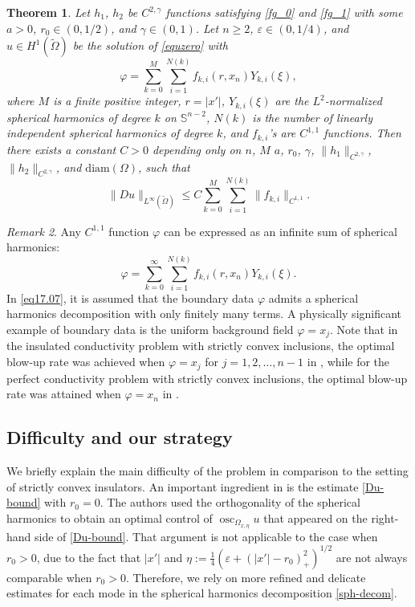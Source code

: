 \documentclass[reqno, 10pt]{amsart}
\theoremstyle{plain}
\newtheorem{theorem}{Theorem}[section]
\theoremstyle{definition}
\theoremstyle{remark}
\newtheorem{remark}[theorem]{Remark}
\newcommand{\osc}{\operatorname{osc}}
\numberwithin{equation}{section}
\begin{document}
\begin{theorem}\label{main-thm}
Let $h_1$, $h_2$ be $C^{2,\gamma}$ functions satisfying \eqref{fg_0} and \eqref{fg_1} with some $a > 0$, $r_0 \in (0, 1/2)$, and $\gamma\in(0,1)$. Let $n \ge 2$, $\varepsilon \in(0,1/4)$, and $u \in H^1(\widetilde\Omega)$ be the solution of \eqref{equzero} with 
\begin{equation}
    \label{eq17.07}
\varphi= \sum_{k=0}^M\sum_{i=1}^{N(k)} {f}_{k,i}(r,x_n)Y_{k,i}(\xi),
\end{equation}
where $M$ is a finite positive integer, $r = |x'|$, $Y_{k,i}(\xi)$ are the $L^2$-normalized spherical harmonics of degree $k$ on $\mathbb{S}^{n-2}$, $N(k)$ is the number of linearly independent spherical harmonics of degree $k$, and ${f}_{k,i}$'s are $C^{1,1}$ functions. Then there exists a constant $C>0$ depending only on $n$, $M$ $a$, $r_0$, $\gamma$, $\|h_1\|_{C^{2,\gamma}}$, $\|h_2\|_{C^{2,\gamma}}$, and $\text{diam}(\Omega)$, such that
\begin{equation}\label{main-eq}
\|D u\|_{L^\infty(\widetilde\Omega)} \le  C \sum_{k=0}^M\sum_{i=1}^{N(k)} \|{f}_{k,i}\|_{C^{1,1}}.
\end{equation}
\end{theorem}

\begin{remark}
Any $C^{1,1}$ function $\varphi$ can be expressed as an infinite sum of spherical harmonics:
$$
\varphi= \sum_{k=0}^\infty \sum_{i=1}^{N(k)} {f}_{k,i}(r,x_n)Y_{k,i}(\xi).
$$
In \eqref{eq17.07}, it is assumed that the boundary data $\varphi$ admits a spherical harmonics decomposition with only finitely many terms.
A physically significant example of boundary data is the uniform background field $\varphi = x_j$. Note that in the insulated conductivity problem with strictly convex inclusions, the optimal blow-up rate was achieved when $\varphi = x_j$ for $j = 1, 2, \ldots, n-1$ in \cites{DLY}, while for the perfect conductivity problem with strictly convex inclusions, the optimal blow-up rate was attained when $\varphi = x_n$ in \cites{BLY1}.
\end{remark}


\subsection{Difficulty and our strategy}\label{sec1.1}

We briefly explain the main difficulty of the problem in comparison to the setting of strictly convex insulators. An important ingredient in \cite{DLY} is the estimate \eqref{Du-bound} with $r_0=0$. The authors used the orthogonality of the spherical harmonics to obtain an optimal control of $\osc_{\Omega_{x,\eta}}u$ that appeared on the right-hand side of \eqref{Du-bound}. That argument is not applicable to the case when $r_0>0$, due to the fact that $|x'|$ and $\eta:= \frac{1}{4} (\varepsilon + (|x'|-r_0)_+^2)^{1/2}$ are not always comparable when $r_0 > 0$. Therefore, we rely on more refined and delicate estimates for each mode in the spherical harmonics decomposition \eqref{sph-decom}.
\end{document}
